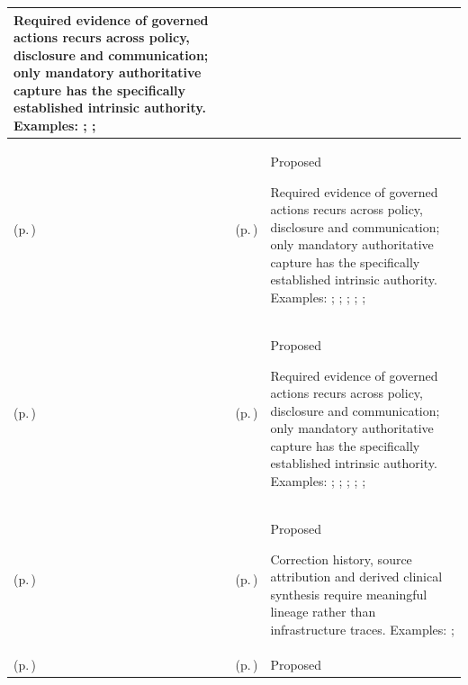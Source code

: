 \begin{longtable}{|>{\raggedright\arraybackslash}p{0.27\TableWidth}|>{\raggedright\arraybackslash}p{0.27\TableWidth}|>{\raggedright\arraybackslash}p{0.46\TableWidth}|}
Required evidence of governed actions recurs across policy, disclosure and communication; only mandatory authoritative capture has the specifically established intrinsic authority. Examples: \nameref{feature:mandatory-significant-activity-audit-capture}; \nameref{function:capture-required-significant-audit-evidence}; \nameref{service:mandatory-audit-evidence-capture}\\\hline
\nameref{cap:bec-health-information-control} (p.\,\pageref{cap:bec-health-information-control}) & \nameref{cap:ec-governed-activity-audit-evidence} (p.\,\pageref{cap:ec-governed-activity-audit-evidence}) & Proposed

Required evidence of governed actions recurs across policy, disclosure and communication; only mandatory authoritative capture has the specifically established intrinsic authority. Examples: \nameref{feature:feat-ise-11}; \nameref{feature:feat-ise-12}; \nameref{feature:feat-ise-13}; \nameref{function:evaluate-information-access-authority}; \nameref{service:policy-evaluation-authorisation-service}; \nameref{function:evaluate-consent-constraint}\\\hline
\nameref{cap:bec-clinical-communication-administration} (p.\,\pageref{cap:bec-clinical-communication-administration}) & \nameref{cap:ec-governed-activity-audit-evidence} (p.\,\pageref{cap:ec-governed-activity-audit-evidence}) & Proposed

Required evidence of governed actions recurs across policy, disclosure and communication; only mandatory authoritative capture has the specifically established intrinsic authority. Examples: \nameref{feature:feat-sa-27}; \nameref{feature:feat-sa-28}; \nameref{feature:feat-sa-29}; \nameref{function:distribute-clinical-communication}; \nameref{service:secure-clinical-message-dispatch}; \nameref{function:track-business-delivery-acknowledgement}\\\hline
\nameref{cap:bec-information-lineage-stewardship} (p.\,\pageref{cap:bec-information-lineage-stewardship}) & \nameref{cap:ec-information-attribution-lineage} (p.\,\pageref{cap:ec-information-attribution-lineage}) & Proposed

Correction history, source attribution and derived clinical synthesis require meaningful lineage rather than infrastructure traces. Examples: \nameref{feature:information-transformation-lineage}; \nameref{function:record-significant-information-lineage}\\\hline
\nameref{cap:bec-person-identity} (p.\,\pageref{cap:bec-person-identity}) & \nameref{cap:ec-information-attribution-lineage} (p.\,\pageref{cap:ec-information-attribution-lineage}) & Proposed


\end{longtable}
